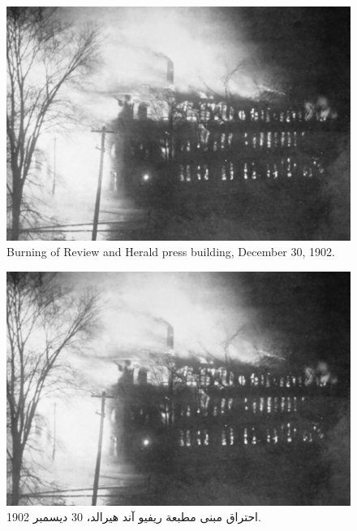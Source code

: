 \begin{figure}[h]
    \centering
    \includegraphics[width=1\linewidth]{images/review-and-herlad.jpg}
    \caption*{Burning of Review and Herald press building, December 30, 1902.}
    \label{fig:review-and-herald}
\end{figure}


\begin{figure}[h]
    \centering
    \includegraphics[width=1\linewidth]{images/review-and-herlad.jpg}
    \caption*{احتراق مبنى مطبعة ريفيو آند هيرالد، 30 ديسمبر 1902.}
    \label{fig:review-and-herald}
\end{figure}


